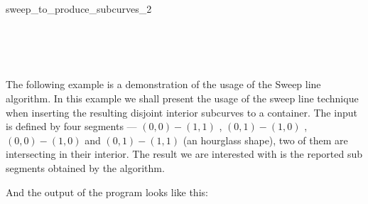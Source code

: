\begin{ccRefFunction}{sweep_to_produce_subcurves_2}
\ccSeeAlso

 \\
 \\
 \\



\ccExample
\label{ssec:example3_sweep}
The following example is a demonstration of the usage of the \ccc
{Sweep line} algorithm. In this example we shall present the usage of
the sweep line technique when inserting the resulting disjoint
interior subcurves to a container. 
The input is defined by four segments
--- $(0,0)-(1,1)$ , $(0,1)-(1,0)$ , $(0,0)-(1,0)$ and $(0,1)-(1,1)$
(an hourglass shape), two of them are intersecting in their
interior. The result we are interested with
is the reported sub segments obtained by the 
algorithm.


And the output of the program looks like this:


\end{ccRefFunction}













